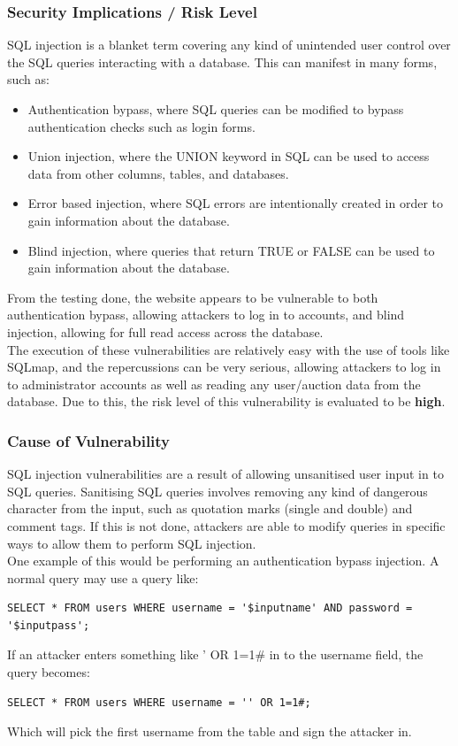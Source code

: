 \documentclass{report}
\begin{document}
\subsubsection{Security Implications / Risk Level}
SQL injection is a blanket term covering any kind of unintended user control over the SQL queries interacting with a database. This can manifest in many forms, such as:
\begin{itemize}
	\item Authentication bypass, where SQL queries can be modified to bypass authentication checks such as login forms.
	\item Union injection, where the UNION keyword in SQL can be used to access data from other columns, tables, and databases.
	\item Error based injection, where SQL errors are intentionally created in order to gain information about the database.
	\item Blind injection, where queries that return TRUE or FALSE can be used to gain information about the database.
\end{itemize}
From the testing done, the website appears to be vulnerable to both authentication bypass, allowing attackers to log in to accounts, and blind injection, allowing for full read access across the database.\\
The execution of these vulnerabilities are relatively easy with the use of tools like SQLmap, and the repercussions can be very serious, allowing attackers to log in to administrator accounts as well as reading any user/auction data from the database. Due to this, the risk level of this vulnerability is evaluated to be \textbf{high}.
\subsubsection{Cause of Vulnerability}
SQL injection vulnerabilities are a result of allowing unsanitised user input in to SQL queries. Sanitising SQL queries involves removing any kind of dangerous character from the input, such as quotation marks (single and double) and comment tags. If this is not done, attackers are able to modify queries in specific ways to allow them to perform SQL injection.\\
One example of this would be performing an authentication bypass injection. A normal query may use a query like:
\begin{verbatim}
SELECT * FROM users WHERE username = '$inputname' AND password = 
'$inputpass';
\end{verbatim}
If an attacker enters something like ' OR 1=1\# in to the username field, the query becomes:
\begin{verbatim}
SELECT * FROM users WHERE username = '' OR 1=1#;
\end{verbatim}
Which will pick the first username from the table and sign the attacker in.
\end{document}

